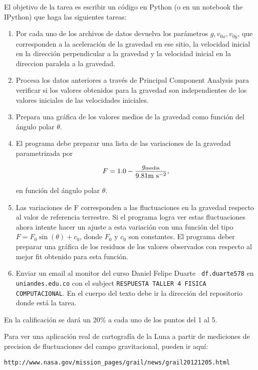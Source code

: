 \documentclass{article}
\begin{document}
El objetivo de la tarea es escribir un c\'odigo en Python (o en un
notebook the IPython) que haga las siguientes tareas:
\begin{enumerate}

\item
Por cada uno de los archivos de datos devuelva los par\'ametros
$g,v_{0x},v_{0y}$, que corresponden a la aceleraci\'on de la gravedad
en ese sitio, la velocidad inicial en la direcci\'on perpendicular a
la gravedad y la velocidad inicial en la direccion paralela a la gravedad.

\item
Procesa los datos anteriores a trav\'es de Principal Component
Analysis para verificar si los valores obtenidos para la gravedad son
independientes de los valores iniciales de las velocidades iniciales.  


\item
Prepara una gr\'afica de los valores medios de la gravedad como funci\'on del
\'angulo polar $\theta$.  

\item 
El programa debe preparar una lista de las variaciones de la gravedad
parametrizada por 

\begin{displaymath}
F=1.0-\frac{g_{\rm media}}{9.81\mathrm{m\ s}^{-2}},
\end{displaymath}

en funci\'on del \'angulo polar $\theta$.

\item 
Las variaciones de F corresponden a las fluctuaciones en la gravedad
respecto al valor de referencia terrestre. Si el programa logra ver
estas fluctuaciones ahora intente hacer un ajuste a esta variaci\'on
con una funci\'on del tipo $F = F_{0}\sin(\theta) + c_{0}$, donde
$F_{0}$ y $c_{0}$ son constantes. El programa deber preparar una
gr\'afica de los residuos de los valores observados con respecto al
mejor fit obtenido para esta funci\'on.    

\item
Enviar un email al monitor del curso Daniel Felipe Duarte {\tt
  df.duarte578} en {\tt uniandes.edu.co} con el subject
\verb"RESPUESTA TALLER 4 FISICA COMPUTACIONAL". En el cuerpo del texto
debe ir la direcci\'on del repositorio donde est\'a la tarea. 


\end{enumerate}

En la calificaci\'on se dar\'a un 20\% a cada uno de los puntos del
1 al 5.

\vspace{1cm}

Para ver una aplicaci\'on real de cartograf\'ia de la Luna a
partir de mediciones de precision de fluctuaciones del campo
gravitacional, pueden ir aqu\'i:

\verb"http://www.nasa.gov/mission_pages/grail/news/grail20121205.html"
\end{document}
